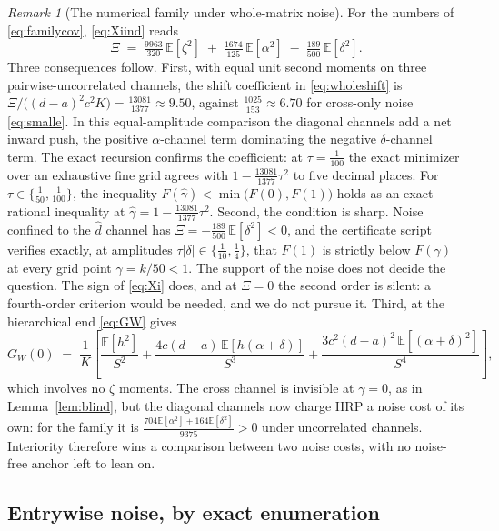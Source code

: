 \documentclass[11pt]{article}
\theoremstyle{remark}
\newtheorem{remark}{Remark}
\newcommand{\E}{\mathbb{E}}
\begin{document}
\begin{remark}[The numerical family under whole-matrix noise]
\label{rem:wholefam}
For the numbers of \eqref{eq:familycov}, \eqref{eq:Xiind} reads
\[
  \Xi \;=\; \tfrac{9963}{320}\,\E[\zeta^2]
  \;+\; \tfrac{1674}{125}\,\E[\alpha^2]
  \;-\; \tfrac{189}{500}\,\E[\delta^2].
\]
Three consequences follow. First, with equal unit second moments on
three pairwise-uncorrelated channels, the shift coefficient in
\eqref{eq:wholeshift} is
$\Xi/\big((d-a)^2c^2K\big) = \tfrac{13081}{1377} \approx 9.50$, against
$\tfrac{1025}{153} \approx 6.70$ for cross-only noise \eqref{eq:smalle}.
In this equal-amplitude comparison the diagonal channels add a net
inward push, the positive $\alpha$-channel term dominating the negative
$\delta$-channel term. The exact recursion confirms the coefficient: at
$\tau = \tfrac{1}{100}$ the exact minimizer over an exhaustive fine grid
agrees with $1 - \tfrac{13081}{1377}\tau^2$ to five decimal places.
For $\tau \in \{\tfrac{1}{50}, \tfrac{1}{100}\}$, the inequality
$F(\hat\gamma) < \min\big(F(0), F(1)\big)$ holds as an exact rational
inequality at $\hat\gamma = 1 - \tfrac{13081}{1377}\tau^2$. Second, the
condition is sharp. Noise confined to the $\hat d$ channel has
$\Xi = -\tfrac{189}{500}\,\E[\delta^2] < 0$, and the certificate script
verifies exactly, at amplitudes $\tau|\delta| \in \{\tfrac{1}{10},
\tfrac14\}$, that $F(1)$ is strictly below $F(\gamma)$ at every grid point
$\gamma = k/50 < 1$. The support of the noise does not decide the
question. The sign of \eqref{eq:Xi} does, and at $\Xi = 0$ the second
order is silent: a fourth-order criterion would be needed, and we do
not pursue it. Third, at the
hierarchical end \eqref{eq:GW} gives
\[
  G_W(0) \;=\; \frac{1}{K}\left[
  \frac{\E[h^2]}{S^2} + \frac{4c(d-a)\,\E[h(\alpha+\delta)]}{S^3}
  + \frac{3c^2(d-a)^2\,\E[(\alpha+\delta)^2]}{S^4}\right],
\]
which involves no $\zeta$ moments. The cross channel is invisible at
$\gamma = 0$, as in Lemma~\ref{lem:blind}, but the diagonal channels now
charge HRP a noise cost of its own: for the family it is
$\tfrac{704\E[\alpha^2] + 164\E[\delta^2]}{9375} > 0$ under uncorrelated
channels. Interiority therefore wins a comparison between two noise
costs, with no noise-free anchor left to lean on.
\end{remark}

\subsection{Entrywise noise, by exact enumeration}
\label{sec:entrywise}
\end{document}
